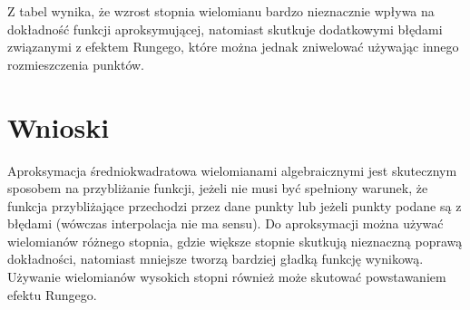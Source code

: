 \documentclass{article}
\begin{document}
Z tabel wynika, że wzrost stopnia wielomianu bardzo nieznacznie wpływa na dokładność funkcji aproksymującej, natomiast skutkuje
dodatkowymi błędami związanymi z efektem Rungego, które można jednak zniwelować używając innego rozmieszczenia punktów.

\newpage
\section{Wnioski}
Aproksymacja średniokwadratowa wielomianami algebraicznymi jest skutecznym sposobem na przybliżanie funkcji, jeżeli nie musi
być spełniony warunek, że funkcja przybliżające przechodzi przez dane punkty lub jeżeli punkty podane są z błędami (wówczas
interpolacja nie ma sensu). Do aproksymacji można używać wielomianów różnego stopnia, gdzie większe stopnie skutkują nieznaczną
poprawą dokładności, natomiast mniejsze tworzą bardziej gładką funkcję wynikową. Używanie wielomianów wysokich stopni również
może skutować powstawaniem efektu Rungego.
\end{document}
